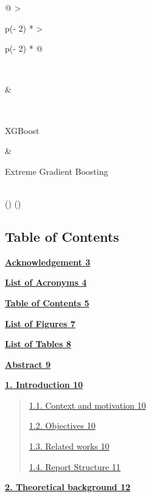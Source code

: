 \documentclass[
]{article}
\begin{document}
\begin{longtable}[]{@{}
  >{\raggedright\arraybackslash}p{(\columnwidth - 2\tabcolsep) * }
  >{\raggedright\arraybackslash}p{(\columnwidth - 2\tabcolsep) * }@{}}
\begin{minipage}[b]{\linewidth}
\end{minipage} \\
\begin{minipage}[b]{\linewidth}\raggedright
\end{minipage} & \begin{minipage}[b]{\linewidth}\raggedright
\end{minipage} \\
\begin{minipage}[b]{\linewidth}\raggedright
XGBoost
\end{minipage} & \begin{minipage}[b]{\linewidth}\raggedright
Extreme Gradient Boosting
\end{minipage} \\
\midrule()
\endhead
\bottomrule()
\end{longtable}

\hypertarget{table-of-contents}{%
\subsection{\texorpdfstring{\textbf{Table of
Contents}}{Table of Contents}}\label{table-of-contents}}

\protect\hyperlink{acknowledgement}{\textbf{Acknowledgement 3}}

\protect\hyperlink{list-of-acronyms}{\textbf{List of Acronyms 4}}

\protect\hyperlink{table-of-contents}{\textbf{Table of Contents 5}}

\protect\hyperlink{list-of-figures}{\textbf{List of Figures 7}}

\protect\hyperlink{list-of-tables}{\textbf{List of Tables 8}}

\protect\hyperlink{abstract}{\textbf{Abstract 9}}

\protect\hyperlink{introduction}{\textbf{1. Introduction 10}}

\begin{quote}
\protect\hyperlink{context-and-motivation}{1.1. Context and motivation
10}

\protect\hyperlink{objectives}{1.2. Objectives 10}

\protect\hyperlink{related-works}{1.3. Related works 10}

\protect\hyperlink{report-structure}{1.4. Report Structure 11}
\end{quote}

\protect\hyperlink{theoretical-background}{\textbf{2. Theoretical
background 12}}
\end{document}
